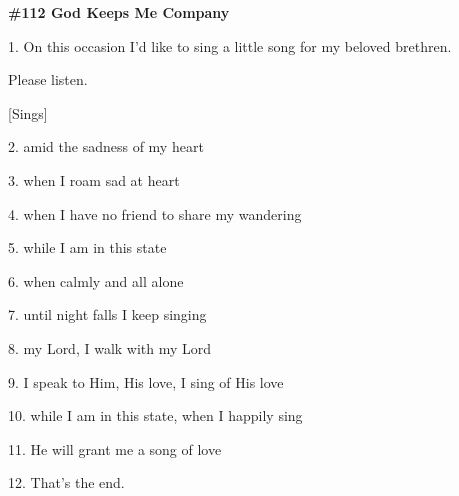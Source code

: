 
{\textbf{\#112 God Keeps Me Company }}

{1. On this occasion I'd like to sing a little song for my beloved brethren.
}

{Please listen.}

{[Sings]}

{2. amid the sadness of my heart}

{3. when I roam sad at heart}

{4. when I have no friend to share my wandering}

{5. while I am in this state}

{6. when calmly and all alone}

{7. until night falls I keep singing}

{8. my Lord, I walk with my Lord}

{9. I speak to Him, His love, I sing of His love}

{10. while I am in this state, when I happily sing}

{11. He will grant me a song of love}

{12. That's the end.}


